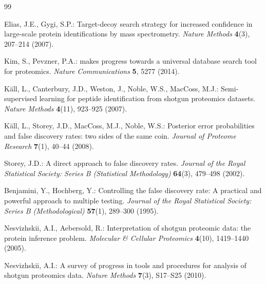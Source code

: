 \documentclass[11pt,twoside,openright]{book}
\begin{document}

\begin{thebibliography}{99}
\small

Elias, J.E., Gygi, S.P.:
\newblock Target-decoy search strategy for increased confidence in large-scale protein identifications by mass spectrometry.
\newblock \emph{Nature Methods} \textbf{4}(3), 207--214 (2007).
\newblock {}

Kim, S., Pevzner, P.A.:
 makes progress towards a universal database search tool for proteomics.
\newblock \emph{Nature Communications} \textbf{5}, 5277 (2014).
\newblock {}

K\"all, L., Canterbury, J.D., Weston, J., Noble, W.S., MacCoss, M.J.:
\newblock Semi-supervised learning for peptide identification from shotgun proteomics datasets.
\newblock \emph{Nature Methods} \textbf{4}(11), 923--925 (2007).
\newblock {}

K\"all, L., Storey, J.D., MacCoss, M.J., Noble, W.S.:
\newblock Posterior error probabilities and false discovery rates: two sides of the same coin.
\newblock \emph{Journal of Proteome Research} \textbf{7}(1), 40--44 (2008).
\newblock {}

Storey, J.D.:
\newblock A direct approach to false discovery rates.
\newblock \emph{Journal of the Royal Statistical Society: Series B (Statistical Methodology)} \textbf{64}(3), 479--498 (2002).
\newblock {}

Benjamini, Y., Hochberg, Y.:
\newblock Controlling the false discovery rate: A practical and powerful approach to multiple testing.
\newblock \emph{Journal of the Royal Statistical Society: Series B (Methodological)} \textbf{57}(1), 289--300 (1995).
\newblock {}

Nesvizhskii, A.I., Aebersold, R.:
\newblock Interpretation of shotgun proteomic data: the protein inference problem.
\newblock \emph{Molecular \& Cellular Proteomics} \textbf{4}(10), 1419--1440 (2005).
\newblock {}

Nesvizhskii, A.I.:
\newblock A survey of progress in tools and procedures for analysis of shotgun proteomics data.
\newblock \emph{Nature Methods} \textbf{7}(3), S17--S25 (2010).
\newblock {}


\end{thebibliography}
\end{document}
